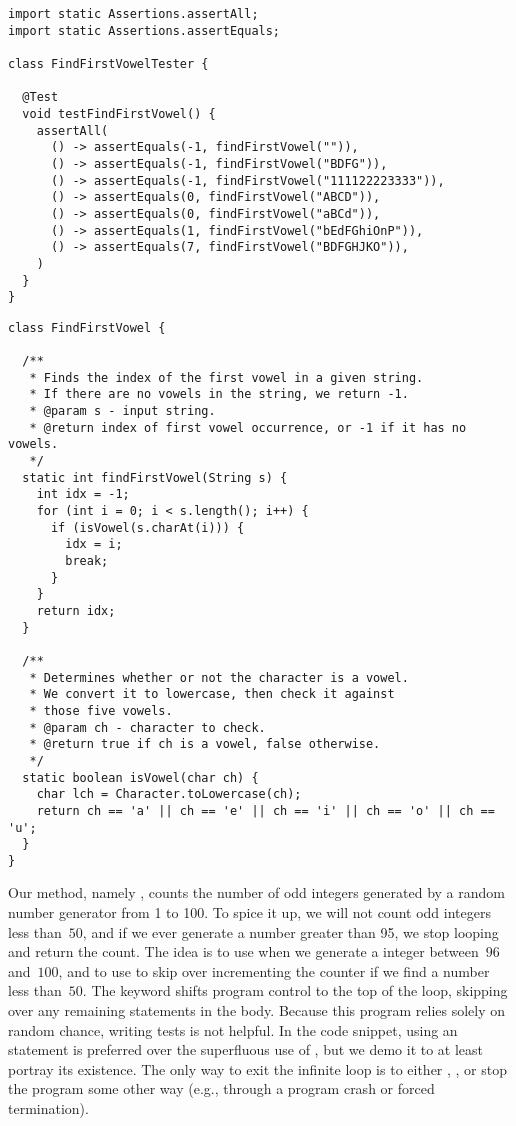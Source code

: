 \begin{lstlisting}[language=MyJava]
import static Assertions.assertAll;
import static Assertions.assertEquals;

class FindFirstVowelTester {

  @Test
  void testFindFirstVowel() {
    assertAll(
      () -> assertEquals(-1, findFirstVowel("")),
      () -> assertEquals(-1, findFirstVowel("BDFG")),
      () -> assertEquals(-1, findFirstVowel("111122223333")),
      () -> assertEquals(0, findFirstVowel("ABCD")),
      () -> assertEquals(0, findFirstVowel("aBCd")),
      () -> assertEquals(1, findFirstVowel("bEdFGhiOnP")),
      () -> assertEquals(7, findFirstVowel("BDFGHJKO")),
    )
  }
}
\end{lstlisting}

\begin{lstlisting}[language=MyJava]
class FindFirstVowel {

  /**
   * Finds the index of the first vowel in a given string. 
   * If there are no vowels in the string, we return -1.
   * @param s - input string.
   * @return index of first vowel occurrence, or -1 if it has no vowels.
   */
  static int findFirstVowel(String s) {
    int idx = -1;
    for (int i = 0; i < s.length(); i++) {
      if (isVowel(s.charAt(i))) {
        idx = i;
        break;
      }
    }
    return idx;
  }

  /**
   * Determines whether or not the character is a vowel. 
   * We convert it to lowercase, then check it against 
   * those five vowels.
   * @param ch - character to check.
   * @return true if ch is a vowel, false otherwise.
   */
  static boolean isVowel(char ch) {
    char lch = Character.toLowercase(ch);
    return ch == 'a' || ch == 'e' || ch == 'i' || ch == 'o' || ch == 'u';
  }
}
\end{lstlisting}

Our method, namely , counts the number of odd integers generated by a random number generator from 1 to 100. 
To spice it up, we will not count odd integers less than~$50$, and if we ever generate a number greater than 95, we stop looping and return the count. 
The idea is to use  when we generate a integer between~$96$ and~$100$, and to use  to skip over incrementing the counter if we find a number less than~$50$. 
The  keyword shifts program control to the top of the loop, skipping over any remaining statements in the body. 
Because this program relies solely on random chance, writing tests is not helpful. 
In the code snippet, using an  statement is preferred over the superfluous use of , but we demo it to at least portray its existence. 
The only way to exit the infinite  loop is to either , , or stop the program some other way (e.g., through a program crash or forced termination).

